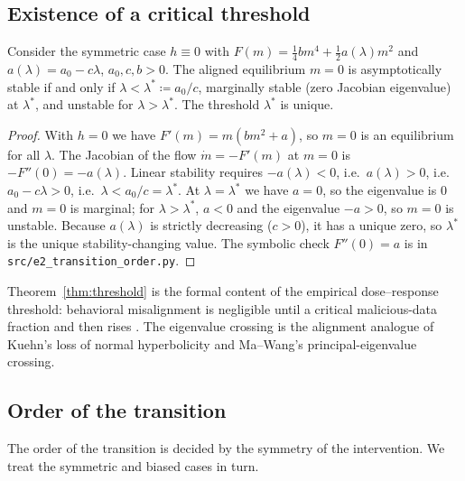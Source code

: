 \subsection{Existence of a critical threshold}\label{sec:thr}

\begin{theorem}\label{thm:threshold}
Consider the symmetric case $h\equiv0$ with $F(m)=\tfrac14 bm^4+\tfrac12 a(\lambda)m^2$ and
$a(\lambda)=a_0-c\lambda$, $a_0,c,b>0$. The aligned equilibrium $m=0$ is asymptotically stable
if and only if $\lambda<\lambda^\ast\coloneqq a_0/c$, marginally stable (zero Jacobian
eigenvalue) at $\lambda^\ast$, and unstable for $\lambda>\lambda^\ast$. The threshold
$\lambda^\ast$ is unique.
\end{theorem}

\begin{proof}
With $h=0$ we have $F'(m)=m(bm^2+a)$, so $m=0$ is an equilibrium for all $\lambda$. The Jacobian
of the flow $\dot m=-F'(m)$ at $m=0$ is $-F''(0)=-a(\lambda)$. Linear stability requires
$-a(\lambda)<0$, i.e.\ $a(\lambda)>0$, i.e.\ $a_0-c\lambda>0$, i.e.\ $\lambda<a_0/c=\lambda^\ast$.
At $\lambda=\lambda^\ast$ we have $a=0$, so the eigenvalue is $0$ and $m=0$ is marginal; for
$\lambda>\lambda^\ast$, $a<0$ and the eigenvalue $-a>0$, so $m=0$ is unstable. Because
$a(\lambda)$ is strictly decreasing ($c>0$), it has a unique zero, so $\lambda^\ast$ is the
unique stability-changing value. The symbolic check $F''(0)=a$ is in
\texttt{src/e2\_transition\_order.py}.
\end{proof}

\begin{remark}\label{rem:threshold}
Theorem~\ref{thm:threshold} is the formal content of the empirical dose--response threshold:
behavioral misalignment is negligible until a critical malicious-data fraction and then rises
\cite{wang2025persona}. The eigenvalue crossing is the alignment analogue of Kuehn's loss of
normal hyperbolicity and Ma--Wang's principal-eigenvalue crossing.
\end{remark}

\subsection{Order of the transition}\label{sec:order}

The order of the transition is decided by the symmetry of the intervention. We treat the
symmetric and biased cases in turn.

